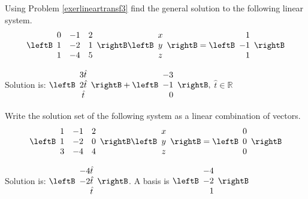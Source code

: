 \begin{enumialphparenastyle}
\begin{ex} Using Problem \ref{exerlineartransf3} find the general solution to the following
linear system. 
\begin{equation*}
\leftB
\begin{array}{rrr}
0 & -1 & 2 \\
1 & -2 & 1 \\
1 & -4 & 5
\end{array}
\rightB \leftB
\begin{array}{c}
x \\
y \\
z
\end{array}
\rightB =\leftB
\begin{array}{r}
1 \\
-1 \\
1
\end{array}
\rightB 
\end{equation*}
\begin{sol}
Solution is: $\leftB
\begin{array}{c}
3\hat{t} \\
2\hat{t} \\
\hat{t}
\end{array}
\rightB +\leftB
\begin{array}{r}
-3 \\
-1 \\
0
\end{array}
\rightB ,$ $\hat{t}\in \mathbb{R}$
\end{sol}
\end{ex}

\begin{ex} \label{exerlineartransf4}Write the solution set of the following system as a linear combination of vectors.
\begin{equation*}
\leftB
\begin{array}{rrr}
1 & -1 & 2 \\
1 & -2 & 0 \\
3 & -4 & 4
\end{array}
\rightB \leftB
\begin{array}{c}
x \\
y \\
z
\end{array}
\rightB =\leftB
\begin{array}{r}
0 \\
0 \\
0
\end{array}
\rightB 
\end{equation*}
\begin{sol}
Solution is: $\leftB
\begin{array}{r}
-4\hat{t} \\
-2\hat{t} \\
\hat{t}
\end{array}
\rightB $. A basis is $\leftB
\begin{array}{r}
-4 \\
-2 \\
1
\end{array}
\rightB $
\end{sol}
\end{ex}


\end{enumialphparenastyle}
